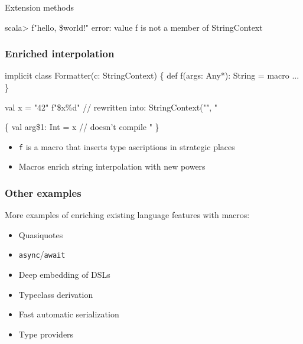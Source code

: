 \documentclass[svgnames,dvipsnames,hyperref={bookmarks=false},usepdftitle=false]{beamer}
\begin{document}
\begin{frame}[fragile]{Extension methods}
\begin{semiverbatim}
scala> f"hello, \$world!"
error: value f is not a member of StringContext


\end{semiverbatim}
\end{frame}

\begin{frame}[fragile]
\frametitle{Enriched interpolation}

\begin{semiverbatim}
implicit class Formatter(c: StringContext) \{
  \alert{def f(args: Any*): String = macro ...}
\}

val x = "42"
\alert{f"}\$x\%d\alert{"} // rewritten into: StringContext("", "%

                          \arrowdown

\{
  val arg\$1: Int = x \alert{// doesn't compile}
  "%
\}

\end{semiverbatim}

\begin{itemize}
\item \texttt{f} is a macro that inserts type ascriptions in strategic places
\item Macros enrich string interpolation with new powers
\end{itemize}
\end{frame}

\begin{frame}[fragile]
\frametitle{Other examples}
More examples of enriching existing language features with macros:
\begin{itemize}
\item Quasiquotes
\item \texttt{async}/\texttt{await}
\item Deep embedding of DSLs
\item Typeclass derivation
\item Fast automatic serialization
\item Type providers
\end{itemize}
\end{frame}
\end{document}
